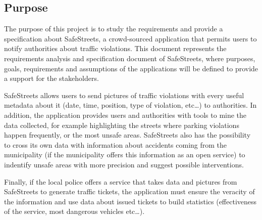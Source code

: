 \subsection{Purpose}
The purpose of this project is to study the requirements and provide a specification about SafeStreets, a crowd-sourced application that permits users to notify authorities about traffic violations. \newline
This document represents the requirements analysis and specification document of SafeStreets, where purposes, goals, requirements and assumptions of the applications will be defined to provide a support for the stakeholders. \newline\par
SafeStreets allows users to send pictures of traffic violations with every useful metadata about it (date, time, position, type of violation, etc…) to authorities. \newline
In addition, the application provides users and authorities with tools to mine the data collected, for example highlighting the streets where parking violations happen frequently, or the most unsafe areas. \newline
SafeStreets also has the possibility to cross its own data with information about accidents coming from the municipality (if the municipality offers this information as an open service) to indentify unsafe areas with more precision and suggest possible interventions. \newline\par
Finally, if the local police offers a service that takes data and pictures from SafeStreets to generate traffic tickets, the application must ensure the veracity of the information and use data about issued tickets to build statistics (effectiveness of the service, most dangerous vehicles etc…). 
